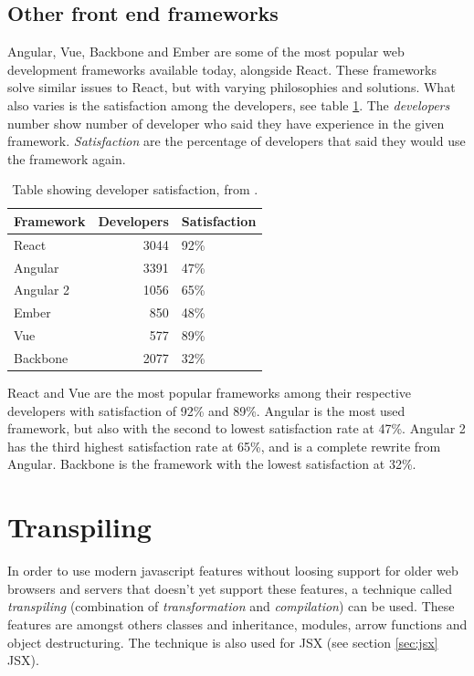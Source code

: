 \subsection{Other front end frameworks} %
\label{sub:angular_and_others}

Angular, Vue, Backbone and Ember are some of the most popular web development frameworks available today, alongside React. \cite{stateofjs} These frameworks solve similar issues to React, but with varying philosophies and solutions. What also varies is the satisfaction among the developers, see table \ref{table:frameworks}. The \emph{developers} number show number of developer who said they have experience in the given framework. \emph{Satisfaction} are the percentage of developers that said they would use the framework again.

\begin{table}
  \begin{center}
    \label{table:frameworks}
    \begin{tabular}{l | r l}
      \textbf{Framework} & \textbf{Developers} & \textbf{Satisfaction} \\
      \hline
      React & 3044 & 92\% \\
      Angular & 3391 & 47\% \\
      Angular 2 & 1056 & 65\% \\
      Ember & 850 & 48\% \\
      Vue & 577 & 89\% \\
      Backbone & 2077 & 32\%
    \end{tabular}
    \caption{Table showing developer satisfaction, from \cite{stateofjs}. }
  \end{center}
\end{table}

React and Vue are the most popular frameworks among their respective developers with satisfaction of 92\% and 89\%. Angular is the most used framework, but also with the second to lowest satisfaction rate at 47\%. Angular 2 has the third highest satisfaction rate at 65\%, and is a complete rewrite from Angular. \cite{angular} Backbone is the framework with the lowest satisfaction at 32\%.

\section{Transpiling}

In order to use modern javascript features without loosing support for older web browsers and servers that doesn't yet support these features, a technique called \emph{transpiling} (combination of \emph{transformation} and \emph{compilation}) can be used. \cite[p. 3-4]{youdontknowjs} These features are amongst others classes and inheritance, modules, arrow functions and object destructuring. The technique is also used for JSX (see section \ref{sec:jsx} JSX).

